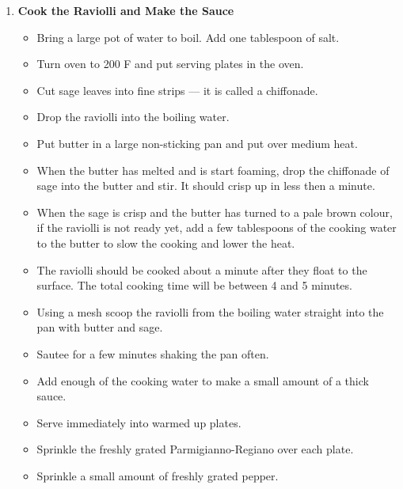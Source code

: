 \documentclass[11pt,letterpaper]{article}
\begin{document}
\begin{description}
\begin{enumerate}
	\item {\bf Cook the Raviolli and Make the Sauce}
	\begin{itemize}
	\item Bring a large pot of water to boil. Add one tablespoon of salt.
	\item Turn oven to 200 F and put serving plates in the oven.
	\item Cut sage leaves into fine strips --- it is called a chiffonade.
	\item Drop the raviolli into the boiling water.
	\item Put butter in a large non-sticking pan and put over medium heat.
	\item When the butter has melted and is start foaming, drop the chiffonade of sage into the butter and stir. It should crisp up in less then a minute.
	\item When the sage is crisp and the butter has turned to a pale brown colour, if the raviolli is not ready yet, add a few tablespoons of the cooking water to the butter to slow the cooking and lower the heat.
	\item The raviolli should be cooked about a minute after they float to the surface. The total cooking time will be between 4 and 5 minutes.
	\item Using a mesh scoop the raviolli from the boiling water straight into the pan with butter and sage.
	\item Sautee for a few minutes shaking the pan often.
	\item Add enough of the cooking water to make a small amount of a thick sauce.
	\item Serve immediately into warmed up plates.
	\item Sprinkle the freshly grated Parmigianno-Regiano over each plate.
	\item Sprinkle a small amount of freshly grated pepper.
	\end{itemize}

	\end{enumerate}
\end{description}
\end{document}
